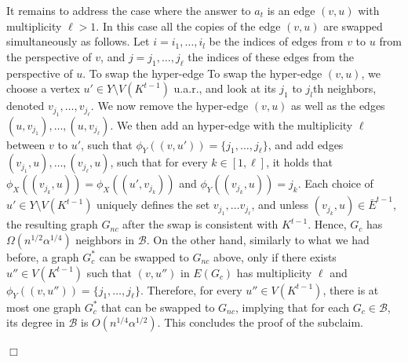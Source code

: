 \documentclass{article}
\newcommand{\calB}{{\mathcal{B}}}
\newcommand{\calD}{{\mathcal{D}}}
\newenvironment{proof}{\smallskip\noindent{\bf Proof:}}%
        {\hspace*{\fill}$\Box$\par}
\newcommand{\commentt}[1]{ {}}
\begin{document}
\begin{proof}
      It remains to address the case where the answer to $a_t$ is an edge $(v,u)$ with multiplicity $\ell>1$.
      In this case all the copies of the edge $(v,u)$ are swapped simultaneously as follows. Let $i=i_1, \ldots, i_l$ be the indices of edges from $v$ to $u$ from the perspective of $v$, and $j=j_1, \ldots, j_{\ell}$ the indices of these edges from the perspective of $u$. To swap the hyper-edge To swap the hyper-edge $(v,u)$, we choose a vertex $u'\in Y\setminus V(K^{t-1})$ u.a.r., and look at its $j_1$ to $j_l$th neighbors,  denoted  $v_{j_1}, \ldots, v_{j_{\ell}}$. We now remove the hyper-edge $(v,u)$ as well as the edges $(u, v_{j_1}), \ldots, (u,v_{j_{\ell}})$. We then  add an hyper-edge with the  multiplicity  $\ell$ between $v$ to $u'$, such that $\phi_Y((v,u'))=\{j_1, \ldots, j_{\ell}\}$, and add edges $(v_{j_1}, u), \ldots, (v_{j_{\ell}}, u)$, such that for every $k\in [1,\ell]$, it holds that  $\phi_X((v_{j_k},u))=\phi_X((u', v_{j_{k}}))$ and $\phi_Y((v_{j_k},u))=j_k$.
      Each choice of $u'\in Y\setminus V(K^{t-1})$ uniquely defines the set $v_{j_1}, \ldots v_{j_\ell}$, and unless $(v_{j_k},u)\in \bar{E}^{t-1}$, the resulting graph $G_{nc}$ after the swap is consistent with $K^{t-1}$. Hence,  $G_c$ has $\Omega(n^{1/2}\alpha^{1/4})$ neighbors in $\calB$.
    On the other hand, similarly to what we had before, a graph $G_{c}^*$ can be swapped to $G_{nc}$ above, only if there exists $u''\in V(K^{t-1})$ such that    $(v,u'')$ in $E(G_{c})$ has multiplicity $\ell$ and $\phi_Y((v,u''))=\{j_1, \ldots, j_{\ell}\}$. Therefore, for every  $u''\in V(K^{t-1})$, there  is at most  one graph $G_c^*$ that can be swapped to $G_{nc}$, implying that for each $G_c\in \calB$, its degree in $\calB$ is $O(n^{1/4}\alpha^{1/2})$. This concludes the proof of the subclaim.




\end{proof}
\fi
\end{document}
